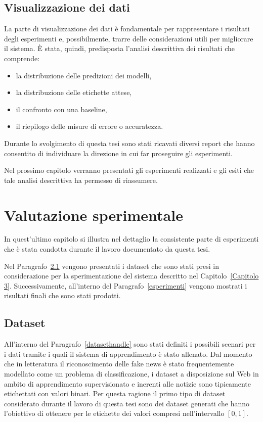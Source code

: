 \documentclass[12pt]{report}
\theoremstyle{definition}
\begin{document}
\section{Visualizzazione dei dati}\label{datavisualizationimpl}
La parte di visualizzazione dei dati è fondamentale per rappresentare i risultati degli esperimenti e, possibilmente, trarre delle considerazioni utili per migliorare il sistema. \`E stata, quindi, predisposta l'analisi descrittiva dei risultati che comprende:
\begin{itemize}
    \item la distribuzione delle predizioni dei modelli,
    \item la distribuzione delle etichette attese,
    \item il confronto con una baseline,
    \item il riepilogo delle misure di errore o accuratezza.
\end{itemize}
Durante lo svolgimento di questa tesi sono stati ricavati diversi report che hanno consentito di individuare la direzione in cui far proseguire gli esperimenti.

Nel prossimo capitolo verranno presentati gli esperimenti realizzati e gli esiti che tale analisi descrittiva ha permesso di riassumere.

\chapter{Valutazione sperimentale}
\label{Capitolo 4}
\onehalfspacing
In quest'ultimo capitolo si illustra nel dettaglio la consistente parte di esperimenti che è stata condotta durante il lavoro documentato da questa tesi.

Nel Paragrafo~\ref{dataset} vengono presentati i dataset che sono stati presi in considerazione per la sperimentazione del sistema descritto nel Capitolo~\ref{Capitolo 3}. Successivamente, all'interno del Paragrafo~\ref{esperimenti} vengono mostrati i risultati finali che sono stati prodotti.

\section{Dataset}\label{dataset}
All'interno del Paragrafo~\ref{datasethandle} sono stati definiti i possibili scenari per i dati tramite i quali il sistema di apprendimento è stato allenato. 
Dal momento che in letteratura il riconoscimento delle fake news è stato frequentemente modellato come un problema di classificazione, i dataset a disposizione sul Web in ambito di apprendimento supervisionato e inerenti alle notizie sono tipicamente etichettati con valori binari.
Per questa ragione il primo tipo di dataset considerato durante il lavoro di questa tesi sono dei dataset generati che hanno l'obiettivo di ottenere per le etichette dei valori compresi nell'intervallo $[0,1]$.
\end{document}
